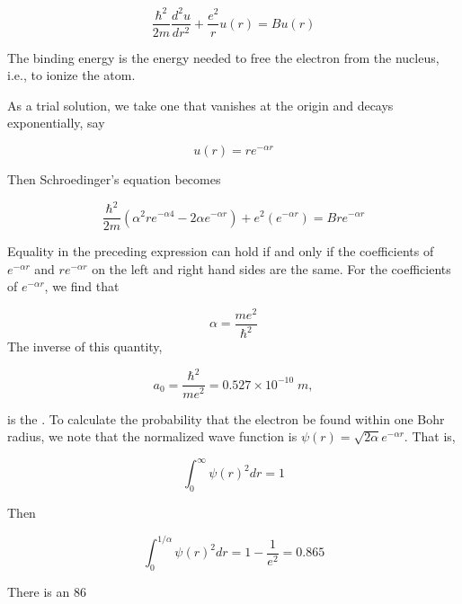 \begin{equation}
\frac{\hbar^2}{2m} \frac{ d^2u }{ dr^2 } + \frac{e^2}{r}u(r) = Bu(r)
\end{equation}

The binding energy is the energy needed to free the electron from the nucleus, i.e., to ionize the atom.


As a trial solution, we take one that vanishes at the origin and decays exponentially, say

\begin{equation}
u(r) = re^{-\alpha r}
\end{equation}

Then Schroedinger's equation becomes

\begin{equation}
\frac{\hbar^2}{2m}\left(  \alpha^2 r e^{-\alpha 4} - 2\alpha e^{-\alpha r} \right) + e^2 (e^{ -\alpha r }) = Bre^{-\alpha r}
\end{equation}

Equality in the preceding expression can hold if and only if
the coefficients of  $e^{-\alpha r}$ and  $re^{-\alpha r}$
on the left and right hand sides are the same.  For the coefficients of $e^{-\alpha r}$, we find that

\begin{equation}
\alpha = \frac{ me^2 }{ \hbar^2 }
\end{equation}
The inverse of this quantity,

\begin{equation}
a_0= \frac{ \hbar^2 }{ me^2 }  = 0.527\times 10^{-10}\;m,
\end{equation}

is the .  To calculate the probability that the electron be found within one Bohr radius, we note that the normalized wave function is $\psi(r) = \sqrt{2\alpha}e^{-\alpha r}$.  That is,

\begin{equation}
\int_0^\infty \psi(r)^2 dr = 1
\end{equation}

Then

\begin{equation}
\int_0^{1/\alpha} \psi(r)^2 dr = 1 - \frac{1}{e^2} = 0.865
\end{equation}

There is an 86%

